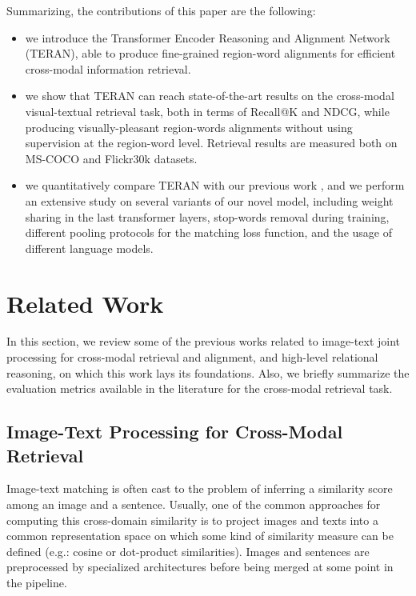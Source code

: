 \documentclass[acmsmall]{acmart}
\newcommand{\majorrevised}[1]{#1}
\begin{document}
Summarizing, the contributions of this paper are the following:
\begin{itemize}
    \item we introduce the Transformer Encoder Reasoning and Alignment Network (TERAN), able to produce fine-grained region-word alignments for efficient cross-modal information retrieval.
    \item we show that TERAN can reach state-of-the-art results on the cross-modal visual-textual retrieval task, both in terms of Recall@K and NDCG, while producing visually-pleasant region-words alignments without using supervision at the region-word level. Retrieval results are measured both on MS-COCO and Flickr30k datasets.
\item \majorrevised{we quantitatively compare TERAN with our previous work \cite{messina2020tern}, and we perform an extensive study on several variants of our novel model, including weight sharing in the last transformer layers, stop-words removal during training, different pooling protocols for the matching loss function, and the usage of different language models}.
\end{itemize}



\section{Related Work}
In this section, we review some of the previous works related to image-text joint processing for cross-modal retrieval \majorrevised{and alignment}, and high-level relational reasoning, on which this work lays its foundations. Also, we briefly summarize the evaluation metrics available in the literature for the cross-modal retrieval task.

\subsection*{Image-Text Processing for Cross-Modal Retrieval}
Image-text matching is often cast to the problem of inferring a similarity score among an image and a sentence. Usually, one of the common approaches for computing this cross-domain similarity is to project images and texts into a common representation space on which some kind of similarity measure can be defined (e.g.: cosine or dot-product similarities).
Images and sentences are preprocessed by specialized architectures before being merged at some point in the pipeline.
\end{document}
